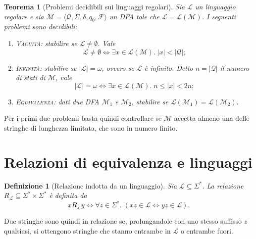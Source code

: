 \documentclass[a4paper, 11pt, oneside]{book}
\theoremstyle{formale}
\newtheorem{theorem}{Teorema}
\newtheorem*{definition}{Definizione}
\begin{document}
    \begin{theorem}[Problemi decidibili sui linguaggi regolari]
        \label{thm:decidibilita}
        Sia $\mathcal{L}$ un linguaggio regolare e sia
        $\mathcal{M} = \langle \mathcal{Q}, \Sigma, \delta, q_0, \mathcal{F} \rangle$ un
        DFA tale che $\mathcal{L} = \mathcal{L}(\mathcal{M})$. I seguenti problemi sono
        decidibili:
        \begin{enumerate}[label=\textup{(\alph*)}]
            \item \textup{\textsc{Vacuit\`a}}: stabilire se $\mathcal{L} \neq \emptyset$.
                Vale
                \begin{equation*}
                    \mathcal{L} \neq \emptyset \iff
                    \exists x \in \mathcal{L}(\mathcal{M}).\; |x| < |\mathcal{Q}|;
                \end{equation*}
            \item \textup{\textsc{Infinit\`a}}: stabilire se $|\mathcal{L}| = \omega$,
                ovvero se $\mathcal{L}$ \`e infinito. Detto $n = |\mathcal{Q}|$ il numero
                di stati di $\mathcal{M}$, vale
                \begin{equation*}
                    |\mathcal{L}| = \omega \iff
                    \exists x \in \mathcal{L}(\mathcal{M}).\; n \leq |x| < 2n;
                \end{equation*}
            \item \textup{\textsc{Equivalenza}}: dati due DFA $\mathcal{M}_1$ e
                $\mathcal{M}_2$, stabilire se $\mathcal{L}(\mathcal{M}_1) =
                \mathcal{L}(\mathcal{M}_2)$.
        \end{enumerate}
    \end{theorem}
    Per i primi due problemi basta quindi controllare se $\mathcal{M}$ accetta almeno una
    delle stringhe di lunghezza limitata, che sono in numero finito.

    \section{Relazioni di equivalenza e linguaggi}
    \begin{definition}[Relazione indotta da un linguaggio]
        Sia $\mathcal{L} \subseteq \Sigma^*$. La relazione
        $R_{\mathcal{L}} \subseteq \Sigma^* \times \Sigma^*$ \`e definita da
        \begin{equation*}
            x \mathrel{R_{\mathcal{L}}} y \iff
            \forall z \in \Sigma^*.\; (xz \in \mathcal{L} \iff yz \in \mathcal{L}).
        \end{equation*}
    \end{definition}
    Due stringhe sono quindi in relazione se, prolungandole con uno stesso suffisso $z$
    qualsiasi, si ottengono stringhe che stanno entrambe in $\mathcal{L}$ o entrambe
    fuori.
\end{document}
